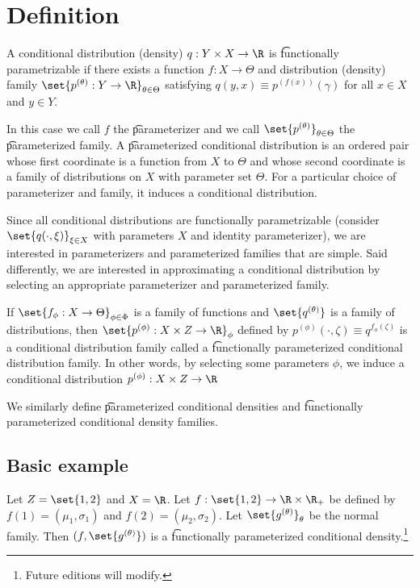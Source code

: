
\section*{Definition}

A conditional distribution (density) $q: Y \times X \to \R $ is \t{functionally parametrizable} if there exists a function $f: X \to \Theta$ and distribution (density) family $\set{p^{(\theta )}: Y \to \R }_{\theta  \in \Theta}$ satisfying $q(y, x) \equiv p^{(f(x))}(\gamma )$ for all $x \in X$ and $y \in Y$.

In this case we call $f$ the \t{parameterizer} and we call $\set{p^{(\theta )}}_{\theta  \in \Theta}$ the \t{parameterized family}.
A \t{parameterized conditional distribution} is an ordered pair whose first coordinate is a function from $X$ to $\Theta$ and whose second coordinate is a family of distributions on $X$ with parameter set $\Theta$.
For a particular choice of parameterizer and family, it induces a conditional distribution.

Since all conditional distributions are functionally parametrizable (consider $\set{q(\cdot , \xi )}_{\xi  \in X}$ with parameters $X$ and identity parameterizer), we are interested in parameterizers and parameterized families that are simple.
Said differently, we are interested in approximating a conditional distribution by selecting an appropriate parameterizer and parameterized family.

If $\set{f_{\phi }: X \to \Theta}_{\phi  \in \Phi}$ is a family of functions and $\set{q^{(\theta )}}$ is a family of distributions, then $\set{p^{(\phi )}: X \times Z \to \R }_{\phi }$ defined by $p^{(\phi )}(\cdot , \zeta ) \equiv q^{f_\phi (\zeta )}$ is a conditional distribution family called a \t{functionally parameterized conditional distribution family}.
In other words, by selecting some parameters $\phi $, we induce a conditional distribution $p^{(\phi )}: X \times Z \to \R $

We similarly define \t{parameterized conditional densities} and \t{functionally parameterized conditional density families}.

\subsection*{Basic example}

Let $Z = \set{1, 2}$ and $X = \R $. Let $f: \set{1, 2} \to \R  \times \R _+$ be defined by $f(1) = (\mu _1, \sigma _1)$ and $f(2) = (\mu _2, \sigma _2)$.
Let $\set{g^{(\theta )}}_{\theta }$ be the normal family.
Then $(f, \set{g^{(\theta )}})$ is a \t{functionally parameterized conditional density}.\footnote{Future editions will modify.}

\blankpage